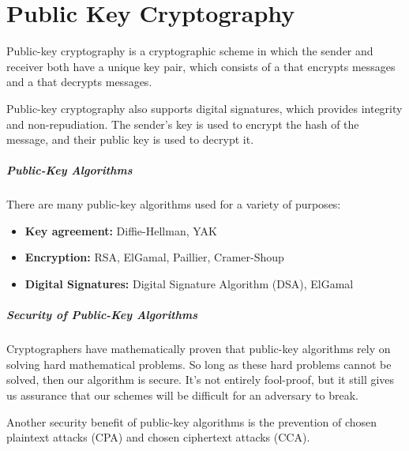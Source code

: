 \chapter{Public Key Cryptography}

\begin{dfnbox}{Public-key cryptography}{}
 is a cryptographic scheme in which the sender and receiver both have a unique key pair, which consists of a  that encrypts messages and a  that decrypts messages.
\end{dfnbox}

Public-key cryptography also supports digital signatures, which provides integrity and non-repudiation. The sender's key is used to encrypt the hash of the message, and their public key is used to decrypt it.

\paragraph{Public-Key Algorithms}
There are many public-key algorithms used for a variety of purposes:
\begin{itemize}
    \item \textbf{Key agreement:} Diffie-Hellman, YAK
    \item \textbf{Encryption:} RSA, ElGamal, Paillier, Cramer-Shoup
    \item \textbf{Digital Signatures:} Digital Signature Algorithm (DSA), ElGamal
\end{itemize}

\paragraph{Security of Public-Key Algorithms}
Cryptographers have mathematically proven that public-key algorithms rely on solving hard mathematical problems. So long as these hard problems cannot be solved, then our algorithm is secure. It's not entirely fool-proof, but it still gives us assurance that our schemes will be difficult for an adversary to break.

Another security benefit of public-key algorithms is the prevention of chosen plaintext attacks (CPA) and chosen ciphertext attacks (CCA).

